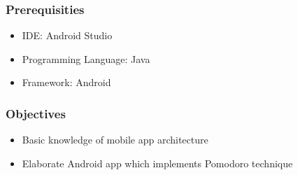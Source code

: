 \subsubsection{Prerequisities}
\begin{itemize}
    \item IDE: Android Studio
    \item Programming Language: Java
    \item Framework: Android
\end{itemize}

\subsubsection{Objectives}
\begin{itemize}
    \item Basic knowledge of mobile app architecture
    \item Elaborate Android app which implements Pomodoro technique
\end{itemize}


